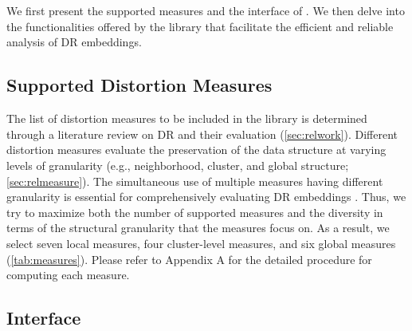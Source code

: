 \section{\library}


We first present the supported measures and the interface of \library. We then delve into the functionalities offered by the library that facilitate the efficient and reliable analysis of DR embeddings. 


\subsection{Supported Distortion Measures}

\label{sec:support}

The list of distortion measures to be included in the library is determined through a literature review on DR and their evaluation (\autoref{sec:relwork}). 
Different distortion measures evaluate the preservation of the data structure at varying levels of granularity (e.g., neighborhood, cluster, and global structure; \autoref{sec:relmeasure}). The simultaneous use of multiple measures having different granularity is essential for comprehensively evaluating DR embeddings \cite{jeon22vis, moor20icml, espadoto21tvcg}. 
Thus, we try to maximize both the number of supported measures and the diversity in terms of the structural granularity that the measures focus on. 
As a result, we select seven local measures, four cluster-level measures, and six global measures (\autoref{tab:measures}). Please refer to Appendix A for the detailed procedure for computing each measure. 



\subsection{Interface}

\label{sec:interface}

